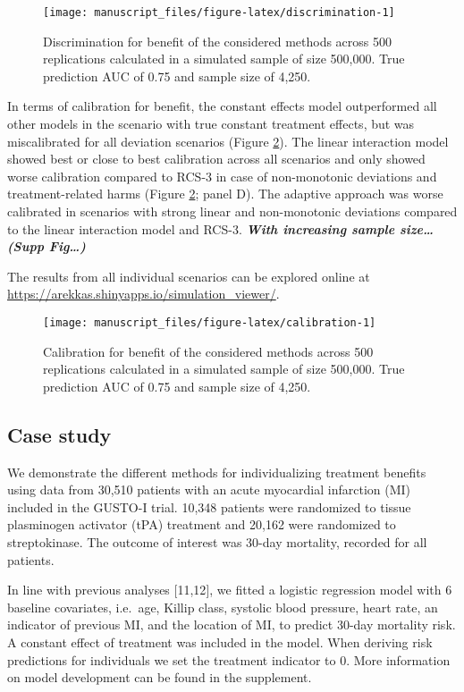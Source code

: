 \documentclass[]{elsarticle} %
\begin{document}
\begin{figure}
\texttt{[image: manuscript\_files/figure-latex/discrimination-1]} \caption{Discrimination for benefit of the considered methods across 500 replications calculated in a simulated sample of size 500,000. True prediction AUC of 0.75 and sample size of 4,250.}\label{fig:discrimination}
\end{figure}

In terms of calibration for benefit, the constant effects model
outperformed all other models in the scenario with true constant
treatment effects, but was miscalibrated for all deviation scenarios
(Figure \ref{fig:calibration}). The linear interaction model showed best
or close to best calibration across all scenarios and only showed worse
calibration compared to RCS-3 in case of non-monotonic deviations and
treatment-related harms (Figure \ref{fig:calibration}; panel D). The
adaptive approach was worse calibrated in scenarios with strong linear
and non-monotonic deviations compared to the linear interaction model
and RCS-3. \textbf{\emph{With increasing sample size\ldots{} (Supp
Fig\ldots)}}

The results from all individual scenarios can be explored online at
\url{https://arekkas.shinyapps.io/simulation_viewer/}.

\begin{figure}
\texttt{[image: manuscript\_files/figure-latex/calibration-1]} \caption{Calibration for benefit of the considered methods across 500 replications calculated in a simulated sample of size 500,000. True prediction AUC of 0.75 and sample size of 4,250.}\label{fig:calibration}
\end{figure}

\hypertarget{case-study}{%
\subsection{Case study}\label{case-study}}

We demonstrate the different methods for individualizing treatment
benefits using data from 30,510 patients with an acute myocardial
infarction (MI) included in the GUSTO-I trial. 10,348 patients were
randomized to tissue plasminogen activator (tPA) treatment and 20,162
were randomized to streptokinase. The outcome of interest was 30-day
mortality, recorded for all patients.

In line with previous analyses {[}11,12{]}, we fitted a logistic
regression model with 6 baseline covariates, i.e.~age, Killip class,
systolic blood pressure, heart rate, an indicator of previous MI, and
the location of MI, to predict 30-day mortality risk. A constant effect
of treatment was included in the model. When deriving risk predictions
for individuals we set the treatment indicator to 0. More information on
model development can be found in the supplement.
\end{document}
